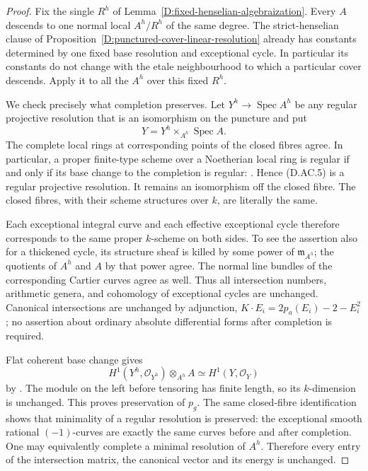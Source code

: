 \begin{proof}
Fix the single $R^h$ of Lemma~\ref{D:fixed-henselian-algebraization}.
Every $A$ descends to one normal local $A^h/R^h$ of the
same degree. The strict-henselian clause of
Proposition~\ref{D:punctured-cover-linear-resolution}
already has constants determined by one fixed base
resolution and exceptional cycle. In particular its
constants do not change with the etale neighbourhood to
which a particular cover descends. Apply it to all the
$A^h$ over this fixed $R^h$.

We check precisely what completion preserves. Let
$Y^h\to\operatorname{Spec}A^h$ be any regular projective
resolution that is an isomorphism on the puncture and put
\[
                   Y=Y^h\times_{A^h}\operatorname{Spec}A.
                                                               \tag{D.AC.5}
\]
The complete local rings at corresponding points of the
closed fibres agree. In particular, a proper finite-type
scheme over a Noetherian local ring is regular if and
only if its base change to the completion is regular:
\citet[Lemmas~54.11.1--54.11.2, Tag~0BG4]
{StacksCompleteBudgetD}. Hence (D.AC.5) is a regular
projective resolution. It remains an isomorphism off the
closed fibre. The closed fibres, with their scheme
structures over $k$, are literally the same.

Each exceptional integral curve and each effective
exceptional cycle therefore corresponds to the same
proper $k$-scheme on both sides. To see the assertion
also for a thickened cycle, its structure sheaf is killed
by some power of $\mathfrak m_{A^h}$; the quotients of
$A^h$ and $A$ by that power agree. The normal line
bundles of the corresponding Cartier curves agree as
well. Thus all intersection numbers, arithmetic genera,
and cohomology of exceptional cycles are unchanged.
Canonical intersections are unchanged by adjunction,
$K\cdot E_i=2p_a(E_i)-2-E_i^2$; no assertion about
ordinary absolute differential forms after completion
is required.

Flat coherent base change gives
\[
 H^1(Y^h,\mathcal O_{Y^h})\otimes_{A^h}A
                    \simeq H^1(Y,\mathcal O_Y)
                                                               \tag{D.AC.6}
\]
by \citet[Lemma~30.5.2, Tag~02KH]{StacksCompleteBudgetD}.
The module on the left before tensoring has finite
length, so its $k$-dimension is unchanged. This proves
preservation of $p_g$. The same closed-fibre identification
shows that minimality of a regular resolution is
preserved: the exceptional smooth rational $(-1)$-curves
are exactly the same curves before and after completion.
One may equivalently complete a minimal resolution of
$A^h$. Therefore every entry of the intersection matrix,
the canonical vector and its energy is unchanged.


\end{proof}
